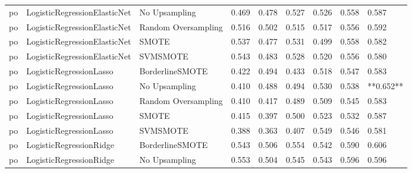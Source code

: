 \begin{tabular}{lllllllll}
      po & LogisticRegressionElasticNet &       No Upsampling & 0.469 &                     0.478 &                 0.527 &                  0.526 &                                   0.558 &     0.587 \\
      po & LogisticRegressionElasticNet & Random Oversampling & 0.516 &                     0.502 &                 0.515 &                  0.517 &                                   0.556 &     0.592 \\
      po & LogisticRegressionElasticNet &               SMOTE & 0.537 &                     0.477 &                 0.531 &                  0.499 &                                   0.558 &     0.582 \\
      po & LogisticRegressionElasticNet &            SVMSMOTE & 0.543 &                     0.483 &                 0.528 &                  0.520 &                                   0.556 &     0.580 \\
      po &      LogisticRegressionLasso &     BorderlineSMOTE & 0.422 &                     0.494 &                 0.433 &                  0.518 &                                   0.547 &     0.583 \\
      po &      LogisticRegressionLasso &       No Upsampling & 0.410 &                     0.488 &                 0.494 &                  0.530 &                                   0.538 & **0.652** \\
      po &      LogisticRegressionLasso & Random Oversampling & 0.410 &                     0.417 &                 0.489 &                  0.509 &                                   0.545 &     0.583 \\
      po &      LogisticRegressionLasso &               SMOTE & 0.415 &                     0.397 &                 0.500 &                  0.523 &                                   0.532 &     0.587 \\
      po &      LogisticRegressionLasso &            SVMSMOTE & 0.388 &                     0.363 &                 0.407 &                  0.549 &                                   0.546 &     0.581 \\
      po &      LogisticRegressionRidge &     BorderlineSMOTE & 0.543 &                     0.506 &                 0.554 &                  0.542 &                                   0.590 &     0.606 \\
      po &      LogisticRegressionRidge &       No Upsampling & 0.553 &                     0.504 &                 0.545 &                  0.543 &                                   0.596 &     0.596 \\

\end{tabular}
